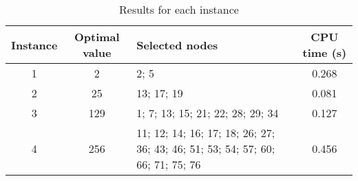 \begin{table}[h]
	\centering
	\begin{tabularx}{\textwidth}{|c|c|X|c|}
		\hline
		\textbf{Instance} & \textbf{Optimal value} & \textbf{Selected nodes} & \textbf{CPU time (s)} \\
		\hline
		1 & 2 & 2; 5 & 0.268 \\
		\hline
		2 & 25 & 13; 17; 19 & 0.081 \\
		\hline
		3 & 129 & 1; 7; 13; 15; 21; 22; 28; 29; 34 & 0.127 \\
		\hline
		4 & 256 & 11; 12; 14; 16; 17; 18; 26; 27; 36; 43; 46; 51; 53; 54; 57; 60; 66; 71; 75; 76 & 0.456 \\
		\hline
	\end{tabularx}
	\caption{Results for each instance}
	\label{tab:instance_costs}
\end{table}
